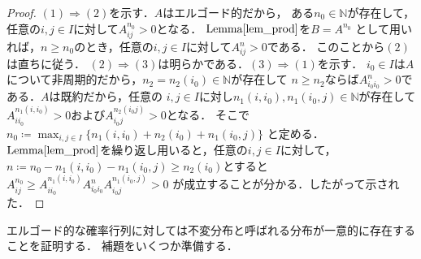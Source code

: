 \documentclass[dvipdfmx,autodetect-engine]{jsarticle}
\theoremstyle{remark}
\theoremstyle{definition}
\newcommand{\N}{\mathbb{N}}
\begin{document}
\begin{proof}
    $(1)\Rightarrow (2)$を示す．$A$はエルゴード的だから，
    ある$n_0 \in \N$が存在して，任意の$i,j \in I$に対して$A_{ij}^{n_0}>0$となる．
    $\mathrm{Lemma}\ref{lem_prod}$を$B = A^{n_0}$
    として用いれば，$n \geq n_0$のとき，任意の$i,j \in I$に対して$A_{ij}^n >0$である．
    このことから$(2)$は直ちに従う．
    $(2)\Rightarrow (3)$は明らかである．$(3) \Rightarrow (1)$を示す．
    $i_0 \in I$は$A$について非周期的だから，$n_2 = n_2(i_0) \in \N$が存在して
    $n \geq n_2$ならば$A_{i_{0} i_{0}}^{n}>0$である．$A$は既約だから，任意の
    $i,j \in I$に対し$n_1(i,i_0),n_1(i_0,j) \in \N$が存在して
    $A_{i i_0}^{n_1(i,i_0)} > 0$および$A_{i_0 j}^{n_2(i_0 j)}>0$となる．
    そこで$n_0 \coloneqq \max_{i,j \in I} \{n_1(i,i_0) + n_2(i_0) + n_1(i_0,j)\}$
    と定める．$\mathrm{Lemma}\ref{lem_prod}$を繰り返し用いると，任意の$i,j \in I$に対して，
    $n \coloneqq n_0 - n_1(i,i_0) - n_1(i_0,j) \geq n_2(i_0)$とすると
    $A_{ij}^{n_0} \geq A_{i i_0}^{n_1(i,i_0)} A_{i_0 i_0}^{n} A_{i_0 j}^{n_1(i_0,j)}>0$
    が成立することが分かる．したがって示された．
\end{proof}


エルゴード的な確率行列に対しては不変分布と呼ばれる分布が一意的に存在することを証明する．
補題をいくつか準備する．
\end{document}

